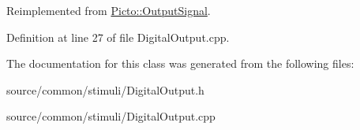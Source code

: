 Reimplemented from \hyperlink{struct_picto_1_1_output_signal_af6516d590c0adf04a169d15cce762368}{Picto\-::\-Output\-Signal}.



Definition at line 27 of file Digital\-Output.\-cpp.



The documentation for this class was generated from the following files\-:\begin{DoxyCompactItemize}
\item 
source/common/stimuli/Digital\-Output.\-h\item 
source/common/stimuli/Digital\-Output.\-cpp\end{DoxyCompactItemize}
